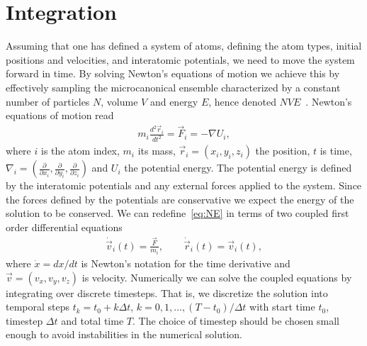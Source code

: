 \section{Integration}\label{sec:integration}
Assuming that one has defined a system of atoms, defining the atom types, initial positions and velocities, and interatomic potentials, we need
to move the system forward in time. By solving Newton's equations of motion we achieve this by effectively sampling the microcanonical ensemble characterized by a constant number of particles $N$, volume $V$ and energy $E$, hence denoted $NVE$~\cite{dfrenkel96:mc}. Newton's equations of motion read
\begin{align}
  m_i \frac{d^2 \vec{r}_i}{dt^2} = \vec{F}_i = -\nabla U_i,
  \label{eq:NE}
\end{align}
where $i$ is the atom index, $m_i$ its mass, $\vec{r}_i = (x_i, y_i,
z_i)$ the position, $t$ is time, $\nabla_i = (\frac{\partial}{\partial x_i},
\frac{\partial}{\partial y_i}, \frac{\partial}{\partial z_i})$ and $U_i$ the
potential energy. The potential energy is defined by the interatomic potentials and any external forces applied to the system. Since the forces defined by the potentials are conservative we expect the energy of the solution
to be conserved. We can redefine~\cref{eq:NE} in terms of two coupled first
order differential equations 
\begin{align}
  \dot{\vec{v}}_i(t) = \frac{\vec{F}}{m_i}, \qquad \dot{\vec{r}}_i(t) = \vec{v}_i(t),
  \label{eq:NE_2}
\end{align}
where $\dot{x} = dx/dt$ is Newton's notation for the time derivative and $\vec{v} = (v_x,v_y,v_z)$ is velocity. Numerically we can solve the coupled equations by integrating over discrete timesteps. That is, we discretize the solution into temporal steps $t_k = t_0 + k\Delta t$, $k = 0, 1, \ldots, (T-t_0)/\Delta t$ with start time $t_0$, timestep $\Delta t$ and total time $T$. The choice of timestep should be chosen small enough to avoid instabilities in the numerical solution.


